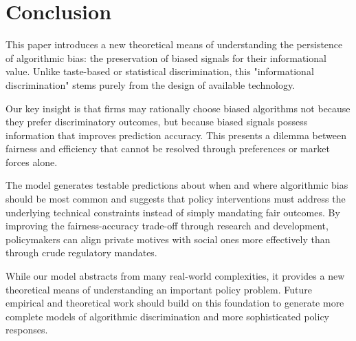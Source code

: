 \section{Conclusion}

This paper introduces a new theoretical means of understanding the persistence of algorithmic bias: the preservation of biased signals for their informational value. Unlike taste-based or statistical discrimination, this "informational discrimination" stems purely from the design of available technology.

Our key insight is that firms may rationally choose biased algorithms not because they prefer discriminatory outcomes, but because biased signals possess information that improves prediction accuracy. This presents a dilemma between fairness and efficiency that cannot be resolved through preferences or market forces alone.

The model generates testable predictions about when and where algorithmic bias should be most common and suggests that policy interventions must address the underlying technical constraints instead of simply mandating fair outcomes. By improving the fairness-accuracy trade-off through research and development, policymakers can align private motives with social ones more effectively than through crude regulatory mandates.

While our model abstracts from many real-world complexities, it provides a new theoretical means of understanding an important policy problem. Future empirical and theoretical work should build on this foundation to generate more complete models of algorithmic discrimination and more sophisticated policy responses.